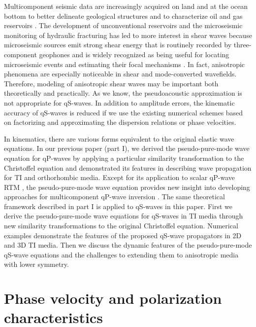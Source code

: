  Multicomponent seismic data are increasingly acquired on land and at the ocean
 bottom to better delineate geological structures and to characterize oil and gas
 reservoirs \cite[]{li:1997,thomsen:1999,cary:2001,stewart:2002,hardage:2011}. 
 The development of unconventional reservoirs and the microseismic monitoring of hydraulic fracturing
 has led to more interest in shear waves because microseismic sources emit strong shear energy that is routinely 
 recorded by three-component geophones \cite[]{maxwell} and is widely recognized as
 being useful for locating microseismic events and estimating their focal mechanisms
\cite[]{baig.urbancic:2010,grechka.yaskevich:2014}.
 In fact, anisotropic phenomena are especially noticeable in shear and mode-converted wavefields.
 Therefore, modeling of anisotropic shear waves
may be important both theoretically and practically.
As we know, the pseudoacoustic approximation is not appropriate for qS-waves.
In addition to amplitude errors, the kinematic accuracy of qS-waves is reduced if we use the
existing numerical schemes based on factorizing and approximating the dispersion relations or phase velocities.

In kinematics, there are various forms equivalent to the original elastic wave equations.
In our previous paper (part I), we derived the pseudo-pure-mode wave equation for qP-waves
by applying a particular similarity transformation to the Christoffel equation and demonstrated its features in
describing wave propagation for TI and orthorhombic media.
Except for its application to scalar qP-wave RTM \cite[]{cheng.kang:2014}, the pseudo-pure-mode wave equation
provides new insight into developing approaches for multicomponent qP-wave inversion
\cite[]{djebbi.alkhalifah:2014}.
The same theoretical framework described in part I is applied to qS-waves in this paper.
First we derive the pseudo-pure-mode wave equations for qS-waves in TI media through
new similarity transformations to the original Christoffel equation.
Numerical examples demonstrate the features of the proposed qS-wave propagators in
 2D and 3D TI media.
Then we discuss the dynamic features of the pseudo-pure-mode qS-wave equations and the challenges to
extending them to anisotropic media with lower symmetry.

%
\section{Phase velocity and polarization characteristics}

